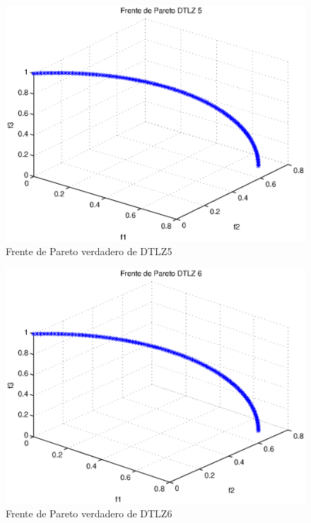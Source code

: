 \begin{figure}
    \centering
    \includegraphics[scale=0.7]{ApendiceA/paretoDTLZ5.eps}
    \caption{Frente de Pareto verdadero de DTLZ5}
    \label{fig:dtlz5}
\end{figure}
\begin{figure}
  \centering
    \includegraphics[scale=0.7]{ApendiceA/paretoDTLZ6.eps}
    \caption{Frente de Pareto verdadero de DTLZ6}
   \label{fig:dtlz6}
\end{figure}
